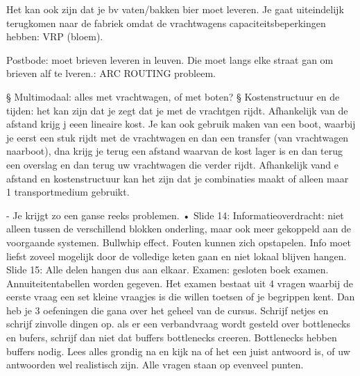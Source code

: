 \documentclass[10pt,a4paper]{report}
\begin{document}
			Het kan ook zijn dat je bv vaten/bakken bier moet leveren. Je gaat uiteindelijk terugkomen naar de fabriek omdat de vrachtwagens capaciteitsbeperkingen hebben: VRP (bloem). 
			
			
			Postbode: moet brieven leveren in leuven. Die moet langs elke straat gan om brieven alf te lveren.: ARC ROUTING probleem.
			
			
			§ Multimodaal: alles met vrachtwagen, of met boten?
			§ Kostenstructuur en de tijden: het kan zijn dat je zegt dat je met de vrachtgen rijdt. Afhankelijk van de afstand krijg j eeen lineaire kost. Je kan ook gebruik maken van een boot, waarbij je eerst een stuk rijdt met de vrachtwagen en dan een transfer (van vrachtwagen naarboot), dna krijg je terug een afstand waarvan de kost lager is en dan terug een overslag en dan terug uw vrachtwagen die verder rijdt. Afhankelijk vand e afstand en kostenstructuur kan het zijn dat je combinaties maakt of alleen maar 1 transportmedium gebruikt.
			
		- Je krijgt zo een ganse reeks problemen.
	• Slide 14: Informatieoverdracht: niet alleen tussen de verschillend blokken onderling, maar ook meer gekoppeld aan de voorgaande systemen. Bullwhip effect. Fouten kunnen zich opstapelen. Info moet liefst zoveel mogelijk door de volledige keten gaan en niet lokaal blijven hangen.
Slide 15: Alle delen hangen dus aan elkaar. 
Examen: gesloten boek examen. Annuiteitentabellen worden gegeven. Het examen bestaat uit 4 vragen waarbij de eerste vraag een set kleine vraagjes is die willen toetsen of je begrippen kent. Dan heb je 3 oefeningen die gana over het geheel van de cursus. Schrijf netjes en schrijf zinvolle dingen op. als er een verbandvraag wordt gesteld over bottlenecks en bufers, schrijf dan niet dat buffers bottlenecks creeren. Bottlenecks hebben buffers nodig.
Lees alles grondig na en kijk na of het een juist antwoord is, of uw antwoorden wel realistisch zijn. 
Alle vragen staan op evenveel punten.
\end{document}
